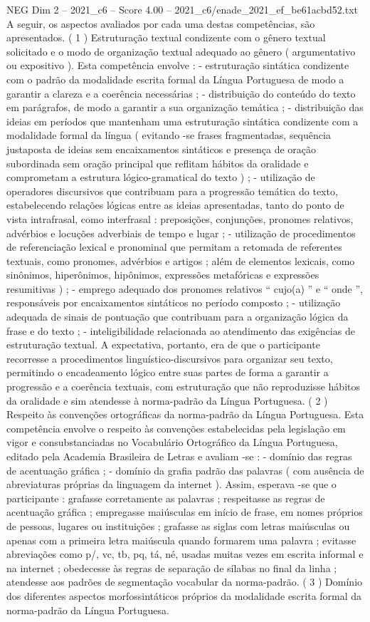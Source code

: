 \begin{textsample}{NEG Dim 2 – 2021\_c6 – Score 4.00 – 2021\_c6/enade\_2021\_ef\_be61acbd52.txt}
A seguir, os aspectos avaliados por cada uma destas competências, são apresentados. ( 1 ) Estruturação textual condizente com o gênero textual solicitado e o modo de organização textual adequado ao gênero ( argumentativo ou expositivo ).
Esta competência envolve : - estruturação sintática condizente com o padrão da modalidade escrita formal da Língua Portuguesa de modo a garantir a clareza e a coerência necessárias ; - distribuição do conteúdo do texto em parágrafos, de modo a garantir a sua organização temática ; - distribuição das ideias em períodos que mantenham uma estruturação sintática condizente com a modalidade formal da língua ( evitando -se frases fragmentadas, sequência justaposta de ideias sem encaixamentos sintáticos e presença de oração subordinada sem oração principal que reflitam hábitos da oralidade e comprometam a estrutura lógico-gramatical do texto ) ; - utilização de operadores discursivos que contribuam para a progressão temática do texto, estabelecendo relações lógicas entre as ideias apresentadas, tanto do ponto de vista intrafrasal, como interfrasal : preposições, conjunções, pronomes relativos, advérbios e locuções adverbiais de tempo e lugar ; - utilização de procedimentos de referenciação lexical e pronominal que permitam a retomada de referentes textuais, como pronomes, advérbios e artigos ; além de elementos lexicais, como sinônimos, hiperônimos, hipônimos, expressões metafóricas e expressões resumitivas ) ; - emprego adequado dos pronomes relativos “ cujo(a) ” e “ onde ”, responsáveis por encaixamentos sintáticos no período composto ; - utilização adequada de sinais de pontuação que contribuam para a organização lógica da frase e do texto ; - inteligibilidade relacionada ao atendimento das exigências de estruturação textual.
A expectativa, portanto, era de que o participante recorresse a procedimentos linguístico-discursivos para organizar seu texto, permitindo o encadeamento lógico entre suas partes de forma a garantir a progressão e a coerência textuais, com estruturação que não reproduzisse hábitos da oralidade e sim atendesse à norma-padrão da Língua Portuguesa. ( 2 ) Respeito às convenções ortográficas da norma-padrão da Língua Portuguesa.
Esta competência envolve o respeito às convenções estabelecidas pela legislação em vigor e consubstanciadas no Vocabulário Ortográfico da Língua Portuguesa, editado pela Academia Brasileira de Letras e avaliam -se : - domínio das regras de acentuação gráfica ; - domínio da grafia padrão das palavras ( com ausência de abreviaturas próprias da linguagem da internet ).
Assim, esperava -se que o participante : grafasse corretamente as palavras ; respeitasse as regras de acentuação gráfica ; empregasse maiúsculas em início de frase, em nomes próprios de pessoas, lugares ou instituições ; grafasse as siglas com letras maiúsculas ou apenas com a primeira letra maiúscula quando formarem uma palavra ; evitasse abreviações como p/, vc, tb, pq, tá, né, usadas muitas vezes em escrita informal e na internet ; obedecesse às regras de separação de sílabas no final da linha ; atendesse aos padrões de segmentação vocabular da norma-padrão. ( 3 ) Domínio dos diferentes aspectos morfossintáticos próprios da modalidade escrita formal da norma-padrão da Língua Portuguesa.

\end{textsample}
